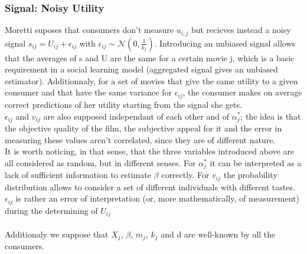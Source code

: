 	\subsubsection{Signal: Noisy Utility}
	Moretti suposes that consumers don't measure $u_{i,j}$ but recieves instead a noisy signal $s_{i j}=U_{i j}+\epsilon_{i j}$ with $\epsilon_{i j}\sim \mathcal{N}(0,\frac{1}{k_{j}})$. Introducing an unbiased signal allows that the averages of s and U are the same for a certain movie j, which is a basic requirement in a social learning model (aggregated signal gives an unbiased estimator). Additionnaly, for a set of movies that give the same utility to a given consumer and that have the same variance for $\epsilon_{i j}$, the consumer makes on average correct predictions of her utility starting from the signal she gets. \\
	$\epsilon_{i j}$ and $v_{i j}$ are also supposed independant of each other and of $\alpha_{j}^{*}$; the idea is that the objective quality of the film, the subjective appeal for it and the error in measuring these values aren't correlated, since they are of different nature.\\
	It is worth noticing, in that sense, that the three variables introduced above are all considered as random, but in different senses. For  $\alpha_{j}^{*}$ it can be interpreted as a lack of sufficient information to estimate $\beta$ correctly. For $v_{i j}$ the probability distribution allows to consider a set of different individuals with different tastes. $\epsilon_{i j}$ is rather an error of interpretation (or, more mathematically, of measurement) during the determining of $U_{i j}$\\\\
	Additionaly we suppose that $X_{j}$, $\beta$, $m_{j}$, $k_{j}$ and d are well-known by all the consumers.
	\\
